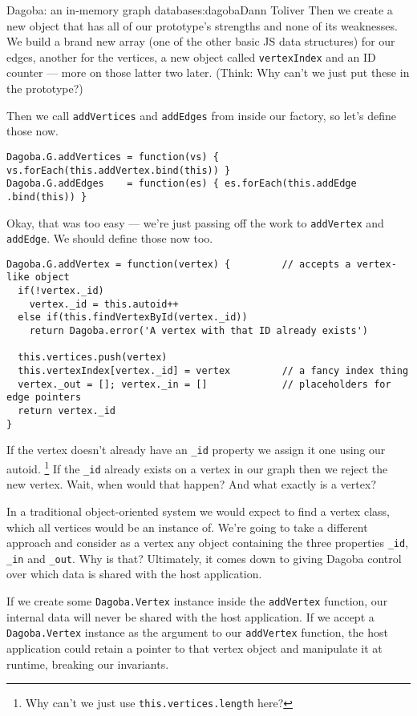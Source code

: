 \begin{aosachapter}{Dagoba: an in-memory graph database}{s:dagoba}{Dann Toliver}
Then we create a new object that has all of our prototype's strengths
and none of its weaknesses. We build a brand new array (one of the other
basic JS data structures) for our edges, another for the vertices, a new
object called \texttt{vertexIndex} and an ID counter --- more on those
latter two later. (Think: Why can't we just put these in the prototype?)

Then we call \texttt{addVertices} and \texttt{addEdges} from inside our
factory, so let's define those now.

\begin{verbatim}
Dagoba.G.addVertices = function(vs) { vs.forEach(this.addVertex.bind(this)) }
Dagoba.G.addEdges    = function(es) { es.forEach(this.addEdge  .bind(this)) }
\end{verbatim}

Okay, that was too easy --- we're just passing off the work to
\texttt{addVertex} and \texttt{addEdge}. We should define those now too.

\begin{verbatim}
Dagoba.G.addVertex = function(vertex) {         // accepts a vertex-like object
  if(!vertex._id)
    vertex._id = this.autoid++
  else if(this.findVertexById(vertex._id))
    return Dagoba.error('A vertex with that ID already exists')

  this.vertices.push(vertex)
  this.vertexIndex[vertex._id] = vertex         // a fancy index thing
  vertex._out = []; vertex._in = []             // placeholders for edge pointers
  return vertex._id
}
\end{verbatim}

If the vertex doesn't already have an \texttt{\_id} property we assign
it one using our autoid. \footnote{Why can't we just use
  \texttt{this.vertices.length} here?} If the \texttt{\_id} already
exists on a vertex in our graph then we reject the new vertex. Wait,
when would that happen? And what exactly is a vertex?

In a traditional object-oriented system we would expect to find a vertex
class, which all vertices would be an instance of. We're going to take a
different approach and consider as a vertex any object containing the
three properties \texttt{\_id}, \texttt{\_in} and \texttt{\_out}. Why is
that? Ultimately, it comes down to giving Dagoba control over which data
is shared with the host application.

If we create some \texttt{Dagoba.Vertex} instance inside the
\texttt{addVertex} function, our internal data will never be shared with
the host application. If we accept a \texttt{Dagoba.Vertex} instance as
the argument to our \texttt{addVertex} function, the host application
could retain a pointer to that vertex object and manipulate it at
runtime, breaking our invariants.


\end{aosachapter}

